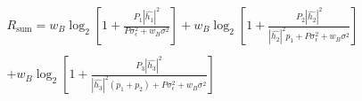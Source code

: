 \documentclass[preview]{standalone}
\begin{document}
\begin{align*}
R_{\mathrm{sum}} =  w_B \log_2 \left[1 + \frac{P_1 \left|\hat{h_1}\right|^2}{P \sigma_{\epsilon}^2 + w_B \sigma^2}\right] + w_B \log_2 \left[1 + \frac{P_2 \left|\hat{h_2}\right|^2}{\left|\hat{h_2}\right|^2 p_1 + P \sigma_{\epsilon}^2 + w_B \sigma^2}\right] \\ \\ + w_B \log_2 \left[1 + \frac{P_3 \left|\hat{h_3}\right|^2}{\left|\hat{h_3}\right|^2 (p_1 + p_2) + P \sigma_{\epsilon}^2 + w_B \sigma^2}\right]
\end{align*}
\end{document}
